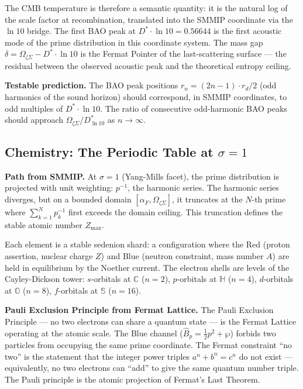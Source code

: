 \documentclass[12pt,a4paper]{article}
\theoremstyle{definition}
\theoremstyle{remark}
\newcommand{\OmZS}{\Omega_{\zeta\Sigma}}
\newcommand{\alphaF}{\alpha_F}
\newcommand{\Dstar}{D^*}
\newcommand{\gap}{\delta}
\begin{document}
The CMB temperature is therefore a semantic quantity: it is the natural log of the
scale factor at recombination, translated into the SMMIP coordinate via the $\ln 10$
bridge. The first BAO peak at $\Dstar\cdot\ln 10 = 0.56644$ is the first acoustic
mode of the prime distribution in this coordinate system.
The mass gap $\gap = \OmZS - \Dstar\cdot\ln 10$ is the Fermat Pointer of the
last-scattering surface --- the residual between the observed acoustic peak and
the theoretical entropy ceiling.

\textbf{Testable prediction.}
The BAO peak positions $r_n = (2n-1)\cdot r_d/2$ (odd harmonics of the sound horizon)
should correspond, in SMMIP coordinates, to odd multiples of $\Dstar\cdot\ln 10$.
The ratio of consecutive odd-harmonic BAO peaks should approach $\OmZS/\Dstar_{\ln 10}$
as $n\to\infty$.

\subsection{Chemistry: The Periodic Table at $\sigma=1$}

\textbf{Path from SMMIP.} At $\sigma=1$ (Yang-Mills facet), the prime distribution
is projected with unit weighting: $p^{-1}$, the harmonic series.
The harmonic series diverges, but on a bounded domain $[\alphaF, \OmZS]$, it truncates
at the $N$-th prime where $\sum_{k=1}^N p_k^{-1}$ first exceeds the domain ceiling.
This truncation defines the stable atomic number $Z_\mathrm{max}$.

Each element is a stable sedenion shard: a configuration where the Red (proton assertion,
nuclear charge $Z$) and Blue (neutron constraint, mass number $A$) are held in equilibrium
by the Noether current. The electron shells are levels of the Cayley-Dickson tower:
$s$-orbitals at $\mathbb{C}$ ($n=2$), $p$-orbitals at $\mathbb{H}$ ($n=4$),
$d$-orbitals at $\mathbb{O}$ ($n=8$), $f$-orbitals at $\mathbb{S}$ ($n=16$).

\textbf{Pauli Exclusion Principle from Fermat Lattice.}
The Pauli Exclusion Principle --- no two electrons can share a quantum state ---
is the Fermat Lattice operating at the atomic scale.
The Blue channel ($\hat{B}_p = \tfrac{1}{2}p^2 + \wp$) forbids two particles
from occupying the same prime coordinate.
The Fermat constraint ``no two'' is the statement that the integer power triples
$a^n + b^n = c^n$ do not exist --- equivalently, no two electrons can ``add''
to give the same quantum number triple. The Pauli principle is the atomic projection
of Fermat's Last Theorem.
\end{document}
